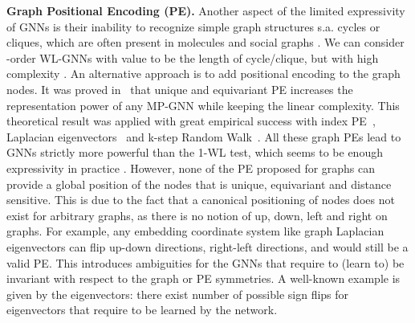 \documentclass{article}
\begin{document}
{\bf Graph Positional Encoding (PE).} Another aspect of the limited expressivity of GNNs is their inability to recognize simple graph structures s.a. cycles or cliques, which are often present in molecules and social graphs \citep{chen2020can}. We can consider -order WL-GNNs with value  to be the length of cycle/clique, but with high complexity . An alternative approach is to add positional encoding to the graph nodes. It was proved in~\citet{murphy2019relational,Loukas2020What} that unique and equivariant PE increases the representation power of any MP-GNN while keeping the linear complexity. 
This theoretical result was applied with great empirical success with index PE~\citep{murphy2019relational},  Laplacian eigenvectors~\citep{dwivedi2020benchmarking,dwivedi2021generalization,kreuzer2021rethinking,lim2022sign} and k-step Random Walk~\citep{li2020distance,dwivedi2021graph}.
All these graph PEs lead to GNNs strictly more powerful than the 1-WL test, which seems to be enough expressivity in practice \citep{zopf20221}. However, none of the PE proposed for graphs can provide a global position of the nodes that is unique, equivariant and distance sensitive. This is due to the fact that a canonical positioning of nodes does not exist for arbitrary graphs, as there is no notion of up, down, left and right on graphs. For example, any embedding coordinate system like graph Laplacian eigenvectors \citep{belkin2003laplacian} can flip up-down directions, right-left directions, and would still be a valid PE. This introduces ambiguities for the GNNs that require to (learn to) be invariant with respect to the graph or PE symmetries. A well-known example is given by the eigenvectors: there exist  number of possible sign flips for  eigenvectors that require to be learned by the network. 
\end{document}

